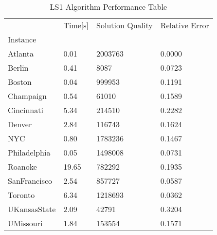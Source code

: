 \begin{table}
\caption{ LS1 Algorithm Performance Table }
\begin{tabular}{llll}
\toprule
{} & Time[s] & Solution Quality & Relative Error \\
Instance     &         &                  &                \\
\midrule
Atlanta      &    0.01 &          2003763 &         0.0000 \\
Berlin       &    0.41 &             8087 &         0.0723 \\
Boston       &    0.04 &           999953 &         0.1191 \\
Champaign    &    0.54 &            61010 &         0.1589 \\
Cincinnati   &    5.34 &           214510 &         0.2282 \\
Denver       &    2.84 &           116743 &         0.1624 \\
NYC          &    0.80 &          1783236 &         0.1467 \\
Philadelphia &    0.05 &          1498008 &         0.0731 \\
Roanoke      &   19.65 &           782292 &         0.1935 \\
SanFrancisco &    2.54 &           857727 &         0.0587 \\
Toronto      &    6.34 &          1218693 &         0.0362 \\
UKansasState &    2.09 &            42791 &         0.3204 \\
UMissouri    &    1.84 &           153554 &         0.1571 \\
\bottomrule
\end{tabular}
\end{table}
